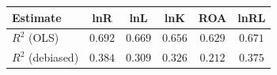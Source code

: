 \begin{tabular}{l*{5}{c}}
\hline\hline
 Estimate & lnR & lnL & lnK & ROA & lnRL \\
\hline
\addlinespace $ R^2$ (OLS) & $0.692$ & $0.669$ & $0.656$ & $0.629$ & $0.671$ \\
$ R^2$ (debiased) & $0.384$ & $0.309$ & $0.326$ & $0.212$ & $0.375$ \\
\hline\hline
\end{tabular}
